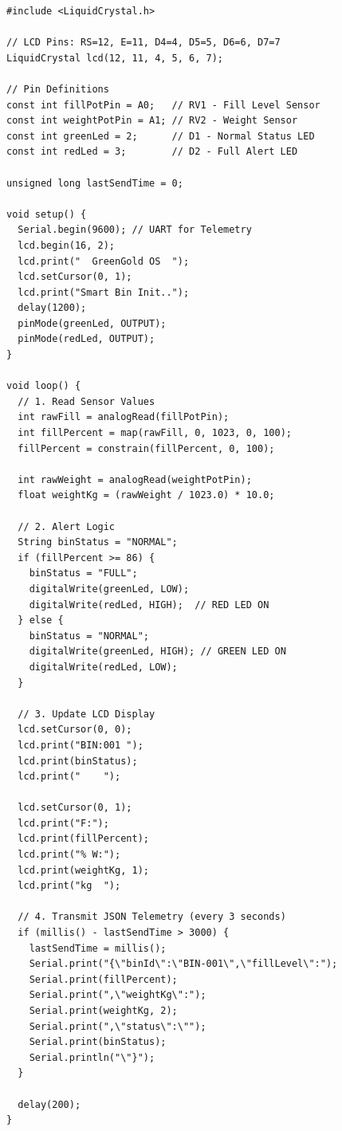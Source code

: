\documentclass[12pt,a4paper]{article}
\begin{document}
\begin{lstlisting}[style=arduino, caption={GreenGold OS Smart Bin -- Arduino Firmware (Proteus)}, label={lst:firmware}]
#include <LiquidCrystal.h>

// LCD Pins: RS=12, E=11, D4=4, D5=5, D6=6, D7=7
LiquidCrystal lcd(12, 11, 4, 5, 6, 7);

// Pin Definitions
const int fillPotPin = A0;   // RV1 - Fill Level Sensor
const int weightPotPin = A1; // RV2 - Weight Sensor
const int greenLed = 2;      // D1 - Normal Status LED
const int redLed = 3;        // D2 - Full Alert LED

unsigned long lastSendTime = 0;

void setup() {
  Serial.begin(9600); // UART for Telemetry
  lcd.begin(16, 2);
  lcd.print("  GreenGold OS  ");
  lcd.setCursor(0, 1);
  lcd.print("Smart Bin Init..");
  delay(1200);
  pinMode(greenLed, OUTPUT);
  pinMode(redLed, OUTPUT);
}

void loop() {
  // 1. Read Sensor Values
  int rawFill = analogRead(fillPotPin);
  int fillPercent = map(rawFill, 0, 1023, 0, 100);
  fillPercent = constrain(fillPercent, 0, 100);

  int rawWeight = analogRead(weightPotPin);
  float weightKg = (rawWeight / 1023.0) * 10.0;

  // 2. Alert Logic
  String binStatus = "NORMAL";
  if (fillPercent >= 86) {
    binStatus = "FULL";
    digitalWrite(greenLed, LOW);
    digitalWrite(redLed, HIGH);  // RED LED ON
  } else {
    binStatus = "NORMAL";
    digitalWrite(greenLed, HIGH); // GREEN LED ON
    digitalWrite(redLed, LOW);
  }

  // 3. Update LCD Display
  lcd.setCursor(0, 0);
  lcd.print("BIN:001 ");
  lcd.print(binStatus);
  lcd.print("    ");

  lcd.setCursor(0, 1);
  lcd.print("F:");
  lcd.print(fillPercent);
  lcd.print("% W:");
  lcd.print(weightKg, 1);
  lcd.print("kg  ");

  // 4. Transmit JSON Telemetry (every 3 seconds)
  if (millis() - lastSendTime > 3000) {
    lastSendTime = millis();
    Serial.print("{\"binId\":\"BIN-001\",\"fillLevel\":");
    Serial.print(fillPercent);
    Serial.print(",\"weightKg\":");
    Serial.print(weightKg, 2);
    Serial.print(",\"status\":\"");
    Serial.print(binStatus);
    Serial.println("\"}");
  }

  delay(200);
}
\end{lstlisting}

\end{document}
